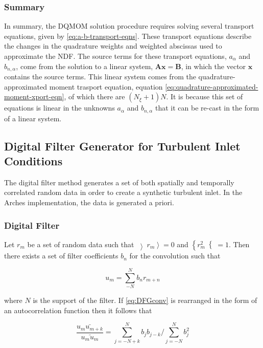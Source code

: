 \subsubsection{Summary}\label{subsubsec:summary}
In summary, the DQMOM solution procedure requires solving several transport equations, given by \ref{eq:a-b-transport-eqns}. These transport equations describe the changes in the quadrature weights and weighted abscissas used to approximate the NDF.  The source terms for these transport equations, $a_{\alpha}$ and $b_{n,\alpha}$, come from the solution to a linear system, $\mathbf{Ax}=\mathbf{B}$, in which the vector $\mathbf{x}$ contains the source terms.  This linear system comes from the quadrature-approximated moment trasport equation, equation \ref{eq:quadrature-approximated-moment-xport-eqn}, of which there are $\left(N_{\xi} + 1\right)N$.  It is because this set of equations is linear in the unknowns $a_{\alpha}$ and $b_{n,\alpha}$ that it can be re-cast in the form of a linear system.

\subsection{Digital Filter Generator for Turbulent Inlet Conditions}\label{sec:DFG}
The digital filter method generates a set of both spatially and temporally correlated random data in order to create a synthetic turbulent inlet.  In the Arches implementation, the data is generated a priori.

\subsubsection{Digital Filter}
Let $r_m$ be a set of random data such that $\left\rangle r_m \right\rangle = 0$ and $\left\lbrace r_m^2 \right\lbrace =1$.  Then there exists a set of filter coefficients $b_n$ for the convolution such that

\begin{equation} \label{eq:DFGconv}
u_m = \sum_{-N}^N b_n r_{m+n}
\end{equation}

where $N$ is the support of the filter. If \ref{eq:DFGconv} is rearranged in the form of an autocorrelation function then it follows that

\begin{equation} \label{eq:DFGauto}
\frac{\bar{u_m u_{m+k} } }{ \bar{u_m u_m }  } = \sum_{j=-N+k}^N b_j b_{j-k} \big/ \sum_{j=-N}^N b_j^2
\end{equation}

